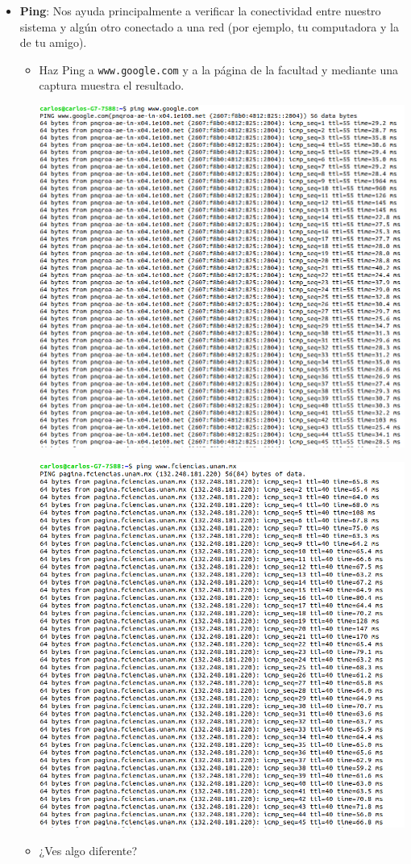 \begin{itemize}
    \item \textbf{Ping}: Nos ayuda principalmente a verificar la conectividad entre nuestro sistema y algún otro conectado a una red (por ejemplo, tu computadora y la de tu amigo).
    \begin{itemize}
        \item Haz Ping a \texttt{www.google.com} y a la página de la facultad y mediante una captura muestra el resultado.
        \begin{center}
            \includegraphics[width=12cm]{IMAGE/google.png}
        \begin{center}
            \includegraphics[width=12cm]{IMAGE/fciencias.png}
        \end{center}
    \end{center}
        \item ¿Ves algo diferente?\\


\end{itemize}
\end{itemize}
